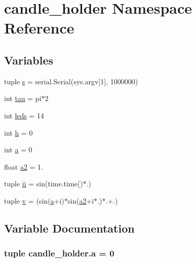 \hypertarget{namespacecandle__holder}{}\section{candle\+\_\+holder Namespace Reference}
\label{namespacecandle__holder}
\subsection*{Variables}
\begin{DoxyCompactItemize}
\item 
tuple \hyperlink{namespacecandle__holder_a4f529b1a261a820096bb5a2bb7968a88}{s} = serial.\+Serial(sys.\+argv\mbox{[}1\mbox{]}, 1000000)
\item 
int \hyperlink{namespacecandle__holder_a40a4d3ecb3bd284031d3fd6cf6771b00}{tau} = pi$\ast$2
\item 
int \hyperlink{namespacecandle__holder_a3004562a5c29137fcef45009d5ef6378}{leds} = 14
\item 
int \hyperlink{namespacecandle__holder_a89636e990d51ad734a60569c4028d605}{h} = 0
\item 
int \hyperlink{namespacecandle__holder_a78edbaa6cf998795f4cf2cb6d4c58f53}{a} = 0
\item 
float \hyperlink{namespacecandle__holder_adb99588fa8a4b90d8c0d3e6fb3c91ca9}{a2} = 1.
\item 
tuple \hyperlink{namespacecandle__holder_a572ae2a8b808ac93694214d3a8c038a1}{ii} = sin(time.\+time()$\ast$.)
\item 
tuple \hyperlink{namespacecandle__holder_abd010b1df2759f4f4b865362247a5fa2}{v} = (sin(\hyperlink{namespacecandle__holder_a78edbaa6cf998795f4cf2cb6d4c58f53}{a}+i)$\ast$sin(\hyperlink{namespacecandle__holder_adb99588fa8a4b90d8c0d3e6fb3c91ca9}{a2}+i$\ast$.)$\ast$.+.)
\end{DoxyCompactItemize}


\subsection{Variable Documentation}
\hypertarget{namespacecandle__holder_a78edbaa6cf998795f4cf2cb6d4c58f53}{}
\subsubsection[{a}]{\setlength{\rightskip}{0pt plus 5cm}tuple candle\+\_\+holder.\+a = 0}\label{namespacecandle__holder_a78edbaa6cf998795f4cf2cb6d4c58f53}
\hypertarget{namespacecandle__holder_adb99588fa8a4b90d8c0d3e6fb3c91ca9}{}

